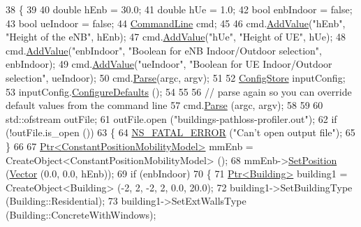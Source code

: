 \begin{DoxyCode}
38 \{
39   
40   \textcolor{keywordtype}{double} hEnb = 30.0;
41   \textcolor{keywordtype}{double} hUe = 1.0;
42   \textcolor{keywordtype}{bool} enbIndoor = \textcolor{keyword}{false};
43   \textcolor{keywordtype}{bool} ueIndoor = \textcolor{keyword}{false};
44   \hyperlink{classns3_1_1CommandLine}{CommandLine} cmd;
45   
46   cmd.\hyperlink{classns3_1_1CommandLine_addcfb546c7ad4c8bd0965654d55beb8e}{AddValue}(\textcolor{stringliteral}{"hEnb"}, \textcolor{stringliteral}{"Height of the eNB"}, hEnb);
47   cmd.\hyperlink{classns3_1_1CommandLine_addcfb546c7ad4c8bd0965654d55beb8e}{AddValue}(\textcolor{stringliteral}{"hUe"}, \textcolor{stringliteral}{"Height of UE"}, hUe);
48   cmd.\hyperlink{classns3_1_1CommandLine_addcfb546c7ad4c8bd0965654d55beb8e}{AddValue}(\textcolor{stringliteral}{"enbIndoor"}, \textcolor{stringliteral}{"Boolean for eNB Indoor/Outdoor selection"},               enbIndoor);
49   cmd.\hyperlink{classns3_1_1CommandLine_addcfb546c7ad4c8bd0965654d55beb8e}{AddValue}(\textcolor{stringliteral}{"ueIndoor"}, \textcolor{stringliteral}{"Boolean for UE Indoor/Outdoor selection"},               ueIndoor);
50   cmd.\hyperlink{classns3_1_1CommandLine_a5c10b85b3207e5ecb48d907966923156}{Parse}(argc, argv);
51   
52   \hyperlink{classns3_1_1ConfigStore}{ConfigStore} inputConfig;
53   inputConfig.\hyperlink{classns3_1_1ConfigStore_a0a6137574d7c847c3823af8b9d1bb886}{ConfigureDefaults} ();
54   
55   
56   \textcolor{comment}{// parse again so you can override default values from the command line}
57   cmd.\hyperlink{classns3_1_1CommandLine_a5c10b85b3207e5ecb48d907966923156}{Parse} (argc, argv);
58   
59   
60   std::ofstream outFile;
61   outFile.open (\textcolor{stringliteral}{"buildings-pathloss-profiler.out"});
62   \textcolor{keywordflow}{if} (!outFile.is\_open ())
63   \{
64     \hyperlink{group__fatal_ga5131d5e3f75d7d4cbfd706ac456fdc85}{NS\_FATAL\_ERROR} (\textcolor{stringliteral}{"Can't open output file"});
65   \}
66   
67   \hyperlink{classns3_1_1Ptr}{Ptr<ConstantPositionMobilityModel>} mmEnb = 
      CreateObject<ConstantPositionMobilityModel> ();
68   mmEnb->\hyperlink{classns3_1_1MobilityModel_ac584b3d5a309709d2f13ed6ada1e7640}{SetPosition} (\hyperlink{classns3_1_1Vector3D_a7e59b47bc94c9cb1dadff68c1d0112d8}{Vector} (0.0, 0.0, hEnb));
69   \textcolor{keywordflow}{if} (enbIndoor)
70     \{
71       \hyperlink{classns3_1_1Ptr}{Ptr<Building>} building1 = CreateObject<Building> (-2, 2, -2, 2, 0.0, 20.0);
72       building1->SetBuildingType (Building::Residential);
73       building1->SetExtWallsType (Building::ConcreteWithWindows);

\end{DoxyCode}
